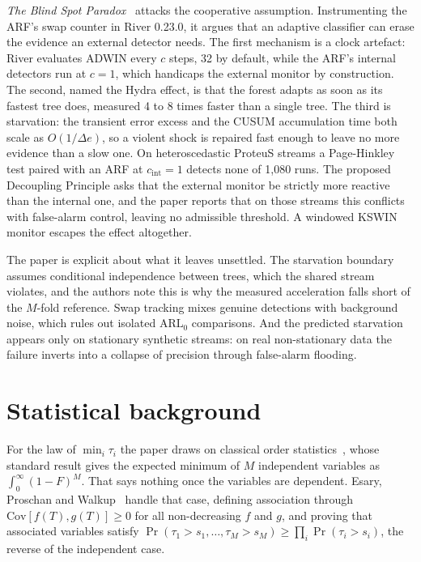 \documentclass[10pt,a4paper]{article}
\begin{document}
\emph{The Blind Spot Paradox}~\cite{blindspot2026} attacks the cooperative assumption.
Instrumenting the ARF's swap counter in River 0.23.0, it argues that an adaptive classifier
can erase the evidence an external detector needs. The first mechanism is a clock artefact:
River evaluates ADWIN every $c$ steps, 32 by default, while the ARF's internal detectors run
at $c=1$, which handicaps the external monitor by construction. The second, named the Hydra
effect, is that the forest adapts as soon as its fastest tree does, measured 4 to 8 times
faster than a single tree. The third is starvation: the transient error excess and the CUSUM
accumulation time both scale as $O(1/\Delta e)$, so a violent shock is repaired fast enough
to leave no more evidence than a slow one. On heteroscedastic ProteuS streams a Page-Hinkley
test paired with an ARF at $c_{\mathrm{int}}{=}1$ detects none of 1{,}080 runs. The proposed
Decoupling Principle asks that the external monitor be strictly more reactive than the
internal one, and the paper reports that on those streams this conflicts with false-alarm
control, leaving no admissible threshold. A windowed KSWIN monitor escapes the effect
altogether.

The paper is explicit about what it leaves unsettled. The starvation boundary assumes
conditional independence between trees, which the shared stream violates, and the authors
note this is why the measured acceleration falls short of the $M$-fold reference. Swap
tracking mixes genuine detections with background noise, which rules out isolated
$\mathrm{ARL}_0$ comparisons. And the predicted starvation appears only on stationary
synthetic streams: on real non-stationary data the failure inverts into a collapse of
precision through false-alarm flooding.

\section{Statistical background}

For the law of $\min_i \tau_i$ the paper draws on classical order statistics~\cite{david2003},
whose standard result gives the expected minimum of $M$ independent variables as
$\int_0^\infty (1-F)^M$. That says nothing once the variables are dependent. Esary, Proschan
and Walkup~\cite{esary1967} handle that case, defining association through
$\mathrm{Cov}[f(T),g(T)]\ge 0$ for all non-decreasing $f$ and $g$, and proving that
associated variables satisfy $\Pr(\tau_1>s_1,\dots,\tau_M>s_M)\ge\prod_i\Pr(\tau_i>s_i)$,
the reverse of the independent case.
\end{document}
